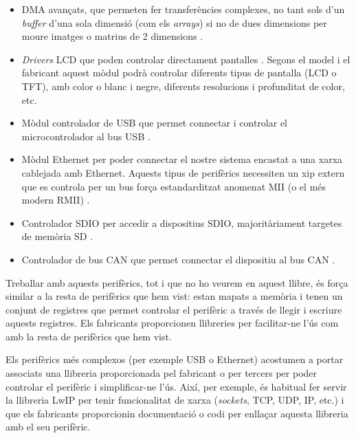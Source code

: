 \begin{itemize}
 \item \gls{DMA} avançats, que permeten fer transferències complexes, no tant sols d'un {\em buffer} d'una sola dimensió (com els {\em arrays}) si no de dues dimensions per moure imatges o matrius de 2 dimensions \cite[339]{STM32F4RM}.
 \item {\em Drivers} \gls{LCD} que poden controlar directament pantalles \cite[480]{STM32F4RM}\cite[490]{EFM32TGRM}. Segons el model i el fabricant aquest mòdul podrà controlar diferents tipus de pantalla (LCD o TFT), amb color o blanc i negre, diferents resolucions i profunditat de color, etc.
 \item Mòdul controlador de USB que permet connectar i controlar el microcontrolador al bus USB \cite[965]{STM32F4RM}\cite[1446]{EFM32GG11RM}.
 \item Mòdul Ethernet per poder connectar el nostre sistema encastat a una xarxa cablejada amb Ethernet. Aquests tipus de perifèrics necessiten un xip extern que es controla per un bus força estandarditzat anomenat \gls{MII} (o el més modern RMII) \cite[1121]{STM32F4RM}\cite[1729]{EFM32GG11RM} \cite{wiki:rmi}.
 \item Controlador \gls{SDIO} per accedir a dispositius SDIO, majoritàriament targetes de memòria SD \cite[1019]{STM32F4RM}\cite[1670]{EFM32GG11RM}.
 \item Controlador de bus \gls{CAN} que permet connectar el dispositiu al bus CAN \cite[1076]{STM32F4RM}\cite[1899]{EFM32GG11RM} \cite{wiki:can}.
\end{itemize}

Treballar amb aquests perifèrics, tot i que no ho veurem en aquest llibre, és força similar a la resta de perifèrics que hem vist: estan mapats a memòria i tenen un conjunt de registres que permet controlar el perifèric a través de llegir i escriure aquests registres. Els fabricants proporcionen llibreries per facilitar-ne l'ús com amb la resta de perifèrics que hem vist.

Els perifèrics més complexos (per exemple USB o Ethernet) acostumen a portar associats una llibreria proporcionada pel fabricant o per tercers per poder controlar el perifèric i simplificar-ne l'ús. Així, per exemple, és habitual fer servir la llibreria LwIP per tenir funcionalitat de xarxa ({\em sockets}, TCP, UDP, IP, etc.) \cite{lwip}\cite{wiki:lwip} i que els fabricants proporcionin documentació o codi per enllaçar aquesta llibreria amb el seu perifèric.


